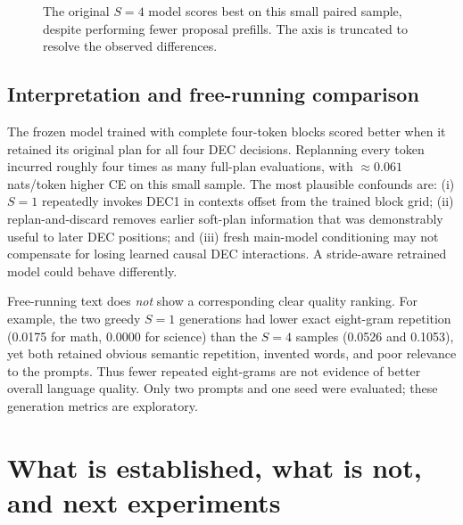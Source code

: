 \documentclass[11pt,letterpaper]{article}
\begin{document}
\begin{figure}[ht]
\centering
{}
\caption{The original $S=4$ model scores best on this small paired sample, despite performing fewer proposal prefills. The axis is truncated to resolve the observed differences.}
\label{fig:stride}
\end{figure}

\subsection{Interpretation and free-running comparison}
The frozen model trained with complete four-token blocks scored better when it retained its original plan for all four DEC decisions. Replanning every token incurred roughly four times as many full-plan evaluations, with $\approx0.061$ nats/token higher CE on this small sample. The most plausible confounds are: (i) $S=1$ repeatedly invokes DEC1 in contexts offset from the trained block grid; (ii) replan-and-discard removes earlier soft-plan information that was demonstrably useful to later DEC positions; and (iii) fresh main-model conditioning may not compensate for losing learned causal DEC interactions. A stride-aware retrained model could behave differently.

Free-running text does \emph{not} show a corresponding clear quality ranking. For example, the two greedy $S=1$ generations had lower exact eight-gram repetition (0.0175 for math, 0.0000 for science) than the $S=4$ samples (0.0526 and 0.1053), yet both retained obvious semantic repetition, invented words, and poor relevance to the prompts. Thus fewer repeated eight-grams are not evidence of better overall language quality. Only two prompts and one seed were evaluated; these generation metrics are exploratory.

\section{What is established, what is not, and next experiments}
\end{document}
